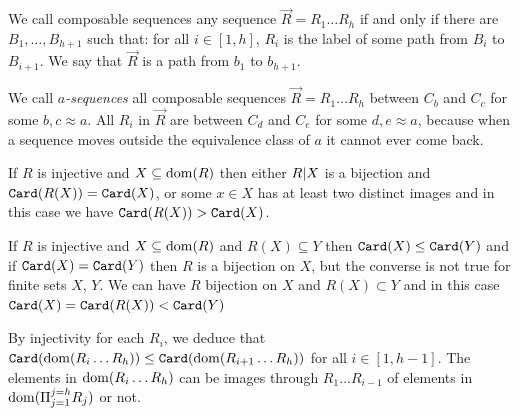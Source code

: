 \documentclass{lmcs}
\begin{document}
We call composable sequences any sequence
$\vec{R} = R_{1} \ldots R_{h}$ if and only if there are $B_1, \ldots, B_{h+1}$
such that: for all $i \in [1,h]$, $R_i$ is the label of some path from $B_i$ to $B_{i+1}$.
We say that $\vec{R}$ is a path from $b_1$ to $b_{h+1}$.

We call \emph{$a$-sequences} all composable sequences 
$\vec{R} = R_{1} \ldots R_{h}$ between $C_b$ and $C_c$ for some $b, c \approx a$.
All $R_i$ in $\vec{R}$ are between $C_d$ and $C_e$ for some $d,e \approx a$,
because when a sequence moves outside the equivalence class of $a$ it cannot ever come back.

If $R$ is injective and $X \subseteq {\rm dom}(R)$ then either $R {|} X$ is a bijection
and ${\tt Card}(R(X)) = {\tt Card}(X)$,
or some $x \in X$ has at least two distinct images and in this case 
we have ${\tt Card}(R(X)) > {\tt Card}(X)$.

If $R$ is injective and $X \subseteq {\rm dom}(R)$ and $R(X) \subseteq Y$ then
${\tt Card}(X) \le {\tt Card}(Y)$ and if ${\tt Card}(X) = {\tt Card}(Y)$ then $R$ is a bijection
on $X$, but the converse is not true for finite sets $X$, $Y$. 
We can have $R$ bijection on $X$ and
$R(X) \subset Y$ and in this case ${\tt Card}(X) = {\tt Card}(R(X)) < {\tt Card}(Y)$

By injectivity for each $R_i$, we deduce that ${\tt Card}({\rm dom}(R_i \ldots R_h))
\le {\tt Card}({\rm dom}(R_{i+1}\ldots R_h))$ for all $i \in [1,h-1]$. The 
elements in ${\rm dom}(R_i \ldots R_h)$ can be images through $R_1 \ldots R_{i-1}$ of elements
in ${\rm dom}(\Pi_{j=1}^{j=h} R_j)$ or not.
\end{document}
